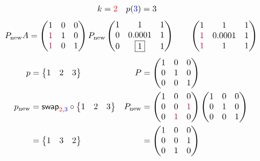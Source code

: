 \documentclass[pdf]{beamer}
\begin{document}
\begin{frame}{}\begin{align*} k &= {\color{red}2} & p({\color{blue}3}) &= 3\end{align*} $$P_{\text{new}}A=\begin{pmatrix}1&0&0\\{\color{purple}1}&1&0\\{\color{purple}1}&0&1\end{pmatrix} P_{\text{new}} \begin{pmatrix}1&1&1\\0&0.0001&1\\0&\boxed{1}&1\end{pmatrix} \quad\quad \begin{pmatrix}1&1&1\\{\color{purple}1}&0.0001&1\\{\color{purple}1}&1&1\end{pmatrix}$$ \begin{align*} p&= \begin{Bmatrix}1&2&3\end{Bmatrix} & P&= \begin{pmatrix}1&0&0\\0&1&0\\0&0&1\end{pmatrix}\\ p_{\text{new}} &= \mathsf{swap}_{{\color{red}2},{\color{blue}3}} \circ \begin{Bmatrix}1&2&3\end{Bmatrix} & P_{\text{new}} &= \begin{pmatrix}1&0&0\\0&0&{\color{purple}1}\\0&{\color{purple}1}&0\end{pmatrix} \begin{pmatrix}1&0&0\\0&1&0\\0&0&1\end{pmatrix}\\ &=\begin{Bmatrix}1&3&2\end{Bmatrix} &&=\begin{pmatrix}1&0&0\\0&0&1\\0&1&0\end{pmatrix}\end{align*}\end{frame}
\end{document}
